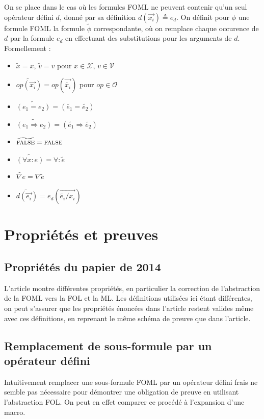 \documentclass[12pt]{article}
\newcommand{\FALSE}{\textsc{false}}
\begin{document}
On se place dans le cas où les formules FOML ne peuvent contenir qu'un seul opérateur défini $d$, donné par sa définition $d(\vec{x_i}) \triangleq e_d$.
On définit pour $\phi$ une formule FOML la formule $\widetilde{\phi}$ correspondante, où on remplace chaque occurence de $d$ par la formule $e_d$ en effectuant des substitutions pour les arguments de $d$. Formellement :
\begin{itemize}
\item
  $\widetilde{x} = x$, $\widetilde{v} = v$ pour $x \in \mathcal{X}$, $v \in \mathcal{V}$
\item
  $\widetilde{op(\vec{x_i})} = op(\vec{\widetilde{x_i}})$ pour $op \in \mathcal{O}$
\item
  $\widetilde{(e_1 = e_2)} = (\widetilde{e_1} = \widetilde{e_2})$
\item
  $\widetilde{(e_1 \Rightarrow e_2)} = (\widetilde{e_1} \Rightarrow \widetilde{e_2})$
\item
  $\widetilde{\FALSE} = \FALSE$
\item
  $\widetilde{(\forall x : e)} = \forall : \widetilde{e}$
\item
  $\widetilde{\nabla e} = \nabla \widetilde{e}$
\item
  $\widetilde{d(\vec{e_i})} = e_d(\vec{\widetilde{e_i}/x_i})$
\end{itemize}


\section{Propriétés et preuves}

\subsection{Propriétés du papier de 2014}

L'article montre différentes propriétés, en particulier la correction de l'abstraction de la FOML vers la FOL et la ML.
Les définitions utilisées ici étant différentes, on peut s'assurer que les propriétés énoncées dans l'article restent valides même avec ces définitions, en reprenant le même schéma de preuve que dans l'article.

\subsection{Remplacement de sous-formule par un opérateur défini}

Intuitivement remplacer une sous-formule FOML par un opérateur défini frais ne semble pas nécessaire pour démontrer une obligation de preuve en utilisant l'abstraction FOL.
On peut en effet comparer ce procédé à l'expansion d'une macro.
\end{document}
